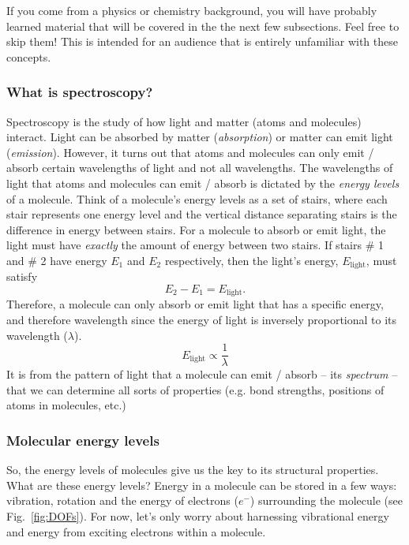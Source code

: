 \documentclass[12pt]{article}
\begin{document}
If you come from a physics or chemistry background, you will have probably learned material that will be covered in the the next few subsections. Feel free to skip them! This is intended for an audience that is entirely unfamiliar with these concepts.

\subsubsection{What is spectroscopy?}

Spectroscopy is the study of how light and matter (atoms and molecules) interact. 
Light can be absorbed by matter (\textit{absorption}) or matter can emit light (\textit{emission}). 
However, it turns out that atoms and molecules can only emit / absorb certain wavelengths of light and not all wavelengths. 
The wavelengths of light that atoms and molecules can emit / absorb is dictated by the \textit{energy levels} of a molecule.
Think of a molecule's energy levels as a set of stairs, where each stair represents one energy level and the vertical distance separating stairs is the difference in energy between stairs. 
For a molecule to absorb or emit light, the light must have \textit{exactly} the amount of energy between two stairs. 
If stairs \# 1 and \# 2 have energy $E_1$ and $E_2$ respectively, then the light's energy, $E_{\text{light}}$, must satisfy
\begin{equation}
    E_2 - E_1 = E_{\text{light}}.
\end{equation}
Therefore, a molecule can only absorb or emit light that has a specific energy, and therefore wavelength since the energy of light is inversely proportional to its wavelength ($\lambda$).
\begin{equation}
    E_{\text{light}} \propto \frac{1}{\lambda}
\end{equation}
It is from the pattern of light that a molecule can emit / absorb -- its \textit{spectrum} -- that we can determine all sorts of properties (e.g. bond strengths, positions of atoms in molecules, etc.)

\subsubsection{Molecular energy levels}

So, the energy levels of molecules give us the key to its structural properties. What are these energy levels? Energy in a molecule can be stored in a few ways: vibration, rotation and the energy of electrons ($e^-$) surrounding the molecule (see Fig.~\ref{fig:DOFs}). For now, let's only worry about harnessing vibrational energy and energy from exciting electrons within a molecule.
\end{document}
